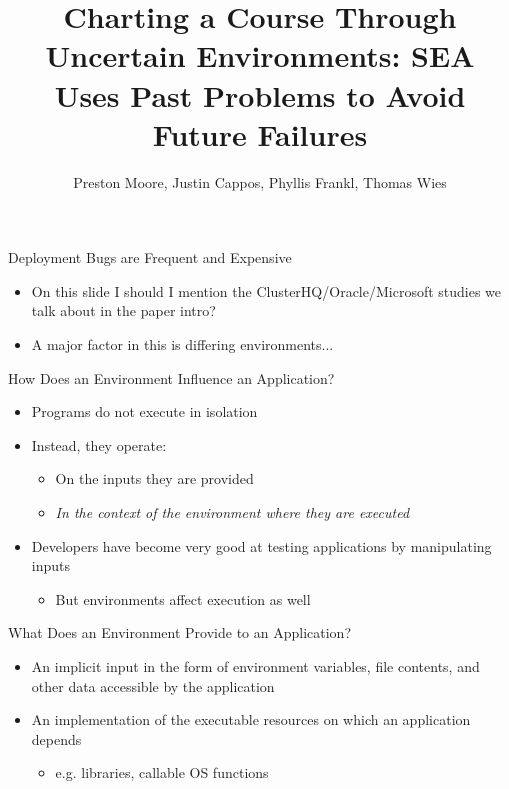 \documentclass[pdf]{beamer}
\title{Charting a Course Through Uncertain Environments: SEA Uses Past
Problems to Avoid Future Failures}
\author{Preston Moore, Justin Cappos, Phyllis Frankl, Thomas Wies}
\begin{document}
\begin{frame}
  \titlepage{}
\end{frame}


\begin{frame}{Deployment Bugs are Frequent and Expensive}
  \begin{itemize}
    \item{On this slide I should I mention the ClusterHQ/Oracle/Microsoft
      studies we talk about in the paper intro?}
    \item{A major factor in this is differing environments...}
  \end{itemize}
\end{frame}

\begin{frame}{How Does an Environment Influence an Application?}
  \begin{itemize}
    \item{Programs do not execute in isolation}
    \item{Instead, they operate:}
      \begin{itemize}
        \item{On the inputs they are provided}
        \item{\textit{In the context of the environment where they are executed}}
      \end{itemize}
    \item{Developers have become very good at testing applications by
      manipulating inputs}
      \begin{itemize}
        \item{But environments affect execution as well}
      \end{itemize}
  \end{itemize}
\end{frame}


\begin{frame}{What Does an Environment Provide to an Application?}
  \begin{itemize}
    \item{An implicit input in the form of environment variables, file
      contents, and other data accessible by the application}
    \item{An implementation of the executable resources on which an application depends}
      \begin{itemize}
        \item{e.g. libraries, callable OS functions}
      \end{itemize}
  \end{itemize}
\end{frame}
\end{document}
